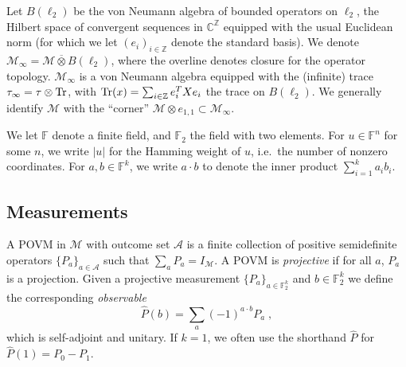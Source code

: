 \documentclass[11pt]{article}
\theoremstyle{definition}
\newcommand{\Tr}{\mbox{\rm Tr}}
\newcommand{\Id}{\ensuremath{I}}
\newcommand{\field}{\mathbb{F}_2}
\newcommand{\C}{\ensuremath{\mathbb{C}}}
\newcommand{\F}{\ensuremath{\mathbb{F}}}
\newcommand{\Z}{\ensuremath{\mathbb{Z}}}
\newcommand{\mA}{\ensuremath{\mathcal{A}}}
\newcommand{\mM}{\ensuremath{\mathcal{M}}}
\begin{document}
	Let $B(\ell_2)$ be the von Neumann algebra of bounded operators on $\ell_2$, the Hilbert space of convergent sequences in $\C^\Z$ equipped with the usual Euclidean norm (for which we let $(e_i)_{i \in \Z}$ denote the standard basis). We denote $\mM_\infty = \mM \overline{\otimes} B(\ell_2)$, where the overline denotes closure for the operator topology. $\mM_\infty$ is a von Neumann algebra equipped with the (infinite) trace $\tau_\infty = \tau \otimes \Tr$, with $\Tr(x)=\sum_{i\in \Z} e_i^T X e_i$ the trace on $B(\ell_2)$. We generally identify $\mM$ with the ``corner'' $\mM\otimes e_{1,1}\subset \mM_\infty$. 

	We let $\F$ denote a finite field, and $\field$ the field with two elements. For $u\in \F^n$ for some $n$, we write $|u|$ for the Hamming weight of $u$, i.e.\ the number of nonzero coordinates. For $a,b \in \F^k$, we write $a \cdot b$ to denote the inner product $\sum_{i=1}^k a_i b_i$. 
	
	
	\subsection{Measurements}
	\label{sec:measurements}
	
	A POVM in $\mM$ with outcome set $\mA$ is a finite collection of positive semidefinite operators $\{P_a\}_{a\in \mA}$ such that $\sum_a P_a = \Id_\mM$. A POVM is \emph{projective} if for all $a$, $P_a$ is a projection. 
	Given a projective measurement $\{P_a\}_{a\in \field^k}$ and $b\in \field^k$ we define the corresponding \emph{observable} 
	\[ \widehat{P}(b) = \sum_a (-1)^{a\cdot b} P_a\;,\]
	which is self-adjoint and unitary. If $k=1$, we often use the shorthand $\widehat{P}$ for $\widehat{P}(1) = P_0-P_1$.
	
\end{document}
